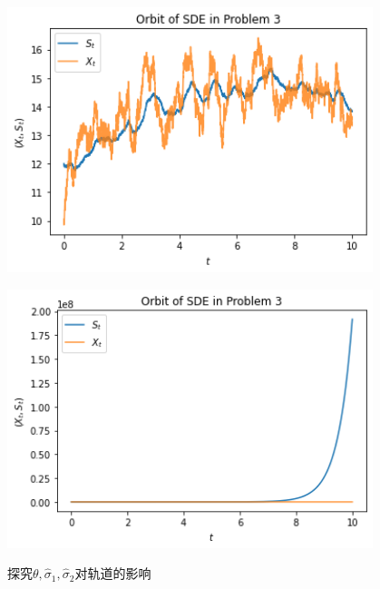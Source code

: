 \documentclass{article}
\begin{document}
\begin{figure}[H]
\begin{minipage}[c]{0.45\textwidth}
        \label{fig:SDE2ts-b}
    \end{minipage}
    \begin{minipage}[c]{0.45\textwidth}
        \centering
        \includegraphics[width=0.95\textwidth]{figures/SDE2 Orbit4.png}
        \label{fig:SDE2ts-c}
    \end{minipage}
    \begin{minipage}[c]{0.45\textwidth}
        \centering
        \includegraphics[width=0.95\textwidth]{figures/SDE2 Orbit5.png}
        \label{fig:SDE2ts-d}
    \end{minipage}
    \caption{探究$\theta, \hat{\sigma}_1, \hat{\sigma}_2$对轨道的影响}
    \label{fig:SDE2ts}
\end{figure}
\end{document}

